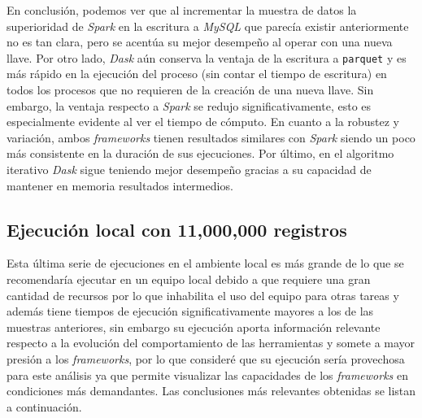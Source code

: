 En conclusión, podemos ver que al incrementar la muestra de datos la superioridad de \textit{Spark} en la escritura a \textit{MySQL} que parecía existir anteriormente no es tan clara, pero se acentúa su mejor desempeño al operar con una nueva llave. Por otro lado, \textit{Dask} aún conserva la ventaja de la escritura a \texttt{parquet} y es más rápido en la ejecución del proceso (sin contar el tiempo de escritura) en todos los procesos que no requieren de la creación de una nueva llave. Sin embargo, la ventaja respecto a \textit{Spark} se redujo significativamente, esto es especialmente evidente al ver el tiempo de cómputo. En cuanto a la robustez y variación, ambos \textit{frameworks} tienen resultados similares con \textit{Spark} siendo un poco más consistente en la duración de sus ejecuciones. Por último, en el algoritmo iterativo \textit{Dask} sigue teniendo mejor desempeño gracias a su capacidad de mantener en memoria resultados intermedios.

\subsection{Ejecución local con 11,000,000 registros}

Esta última serie de ejecuciones en el ambiente local es más grande de lo que se recomendaría ejecutar en un equipo local debido a que requiere una gran cantidad de recursos por lo que inhabilita el uso del equipo para otras tareas y además tiene tiempos de ejecución significativamente mayores a los de las muestras anteriores, sin embargo su ejecución aporta información relevante respecto a la evolución del comportamiento de las herramientas y somete a mayor presión a los \textit{frameworks}, por lo que consideré que su ejecución sería provechosa para este análisis ya que permite visualizar las capacidades de los \textit{frameworks} en condiciones más demandantes. Las conclusiones más relevantes obtenidas se listan a continuación.

